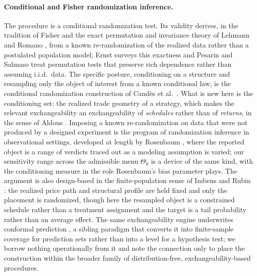 \documentclass[risks,article,submit,pdftex,oneauthor]{Definitions/mdpi}
\begin{document}
\paragraph{Conditional and Fisher randomization inference.} The procedure is a conditional
randomization test. Its validity derives, in the tradition of Fisher \citep{Fisher1935}
and the exact permutation and invariance theory of Lehmann and Romano \citep{LehmannRomano2005},
from a known re-randomization of the realized data rather than a postulated population
model; Ernst \citep{Ernst2004} surveys this exactness and Pesarin and Salmaso
\citep{PesarinSalmaso2010} treat permutation tests that preserve rich dependence rather
than assuming i.i.d.\ data. The specific posture, conditioning on a structure and resampling only
the object of interest from a known conditional law, is the conditional randomization
construction of Cand\`es et al.\ \citep{Candes2018}. What is new here is the conditioning
set: the realized trade geometry of a strategy, which makes the relevant exchangeability
an exchangeability of \emph{schedules} rather than of \emph{returns}, in the sense of
Aldous \citep{Aldous1985}. Imposing a known re-randomization on data that were not produced by a designed experiment is the program of randomization inference in observational settings, developed at length by Rosenbaum \citep{Rosenbaum2002}, where the reported object is a range of verdicts traced out as a modeling assumption is varied; our sensitivity range across the admissible menu $\Theta_0$ is a device of the same kind, with the conditioning measure in the role Rosenbaum's bias parameter plays. The argument is also design-based in the finite-population sense of Imbens and Rubin \citep{ImbensRubin2015}: the realized price path and structural profile are held fixed and only the placement is randomized, though here the resampled object is a constrained schedule rather than a treatment assignment and the target is a tail probability rather than an average effect. The same exchangeability engine underwrites conformal prediction \citep{Vovk2005,Lei2018}, a sibling paradigm that converts it into finite-sample coverage for prediction sets rather than into a level for a hypothesis test; we borrow nothing operationally from it and note the connection only to place the construction within the broader family of distribution-free, exchangeability-based procedures.
\end{document}
